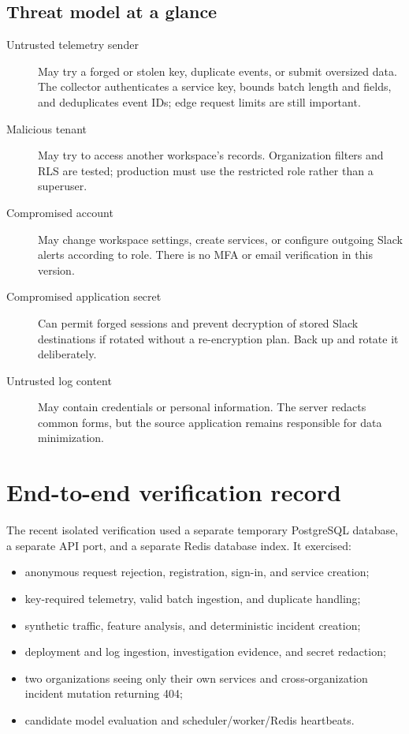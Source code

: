 \documentclass[11pt,a4paper]{article}
\begin{document}
\subsection{Threat model at a glance}
\begin{description}
  \item[Untrusted telemetry sender] May try a forged or stolen key, duplicate
  events, or submit oversized data. The collector authenticates a service key,
  bounds batch length and fields, and deduplicates event IDs; edge request
  limits are still important.
  \item[Malicious tenant] May try to access another workspace's records.
  Organization filters and RLS are tested; production must use the restricted
  role rather than a superuser.
  \item[Compromised account] May change workspace settings, create services, or
  configure outgoing Slack alerts according to role. There is no MFA or email
  verification in this version.
  \item[Compromised application secret] Can permit forged sessions and prevent
  decryption of stored Slack destinations if rotated without a re-encryption
  plan. Back up and rotate it deliberately.
  \item[Untrusted log content] May contain credentials or personal information.
  The server redacts common forms, but the source application remains responsible
  for data minimization.
\end{description}

\section{End-to-end verification record}

The recent isolated verification used a separate temporary PostgreSQL database,
a separate API port, and a separate Redis database index. It exercised:
\begin{itemize}
  \item anonymous request rejection, registration, sign-in, and service creation;
  \item key-required telemetry, valid batch ingestion, and duplicate handling;
  \item synthetic traffic, feature analysis, and deterministic incident creation;
  \item deployment and log ingestion, investigation evidence, and secret redaction;
  \item two organizations seeing only their own services and cross-organization
  incident mutation returning 404;
  \item candidate model evaluation and scheduler/worker/Redis heartbeats.
\end{itemize}
\end{document}
